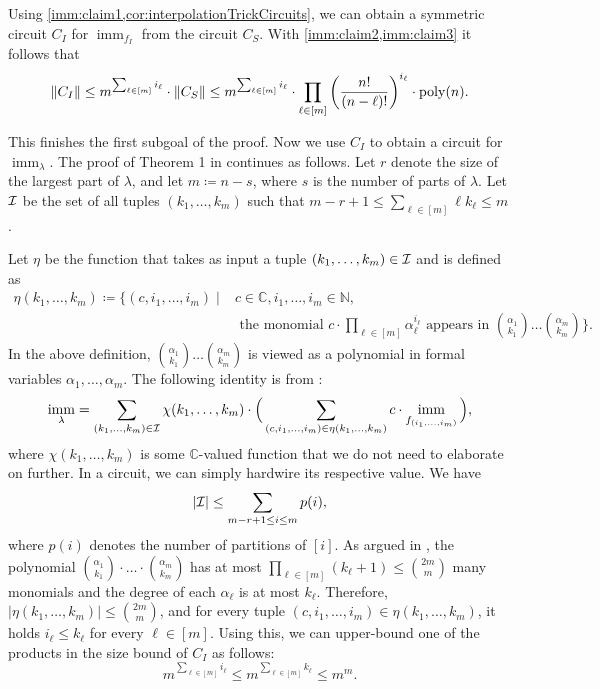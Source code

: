 \documentclass[11pt, DIV=15]{scrarticle}
\theoremstyle{definition}
\theoremstyle{plain}
\theoremstyle{remark}
\DeclarePairedDelimiter{\norm}{\lVert}{\rVert}
\newcommand{\Ii}{{\cal I}}
\newcommand{\bbN}{\mathbb{N}}
\DeclareMathOperator{\imm}{imm}
\begin{document}
Using \cref{imm:claim1,cor:interpolationTrickCircuits}, we can obtain a symmetric circuit $C_I$ for $\imm_{f_I}$ from the circuit $C_S$. With \cref{imm:claim2,imm:claim3} it follows that 
\[
\norm{C_I} \leq m^{\sum_{\ell \in [m]} i_\ell} \cdot \norm{C_S} \leq  m^{\sum_{\ell \in [m]} i_\ell} \cdot \prod_{\ell \in [m]} \left(\frac{n!}{(n-\ell)!} \right)^{i_\ell} \cdot \operatorname{poly}(n).
\]

This finishes the first subgoal of the proof. Now we use $C_I$ to obtain a circuit for $\imm_{\lambda}$.
The proof of Theorem 1 in \cite{hartmann1985complexity} continues as follows. Let $r$ denote the size of the largest part of $\lambda$, and let $m \coloneqq n-s$, where $s$ is the number of parts of $\lambda$.
Let $\Ii$ be the set of all tuples $(k_1,\dots ,k_m)$ such that $m-r+1 \leq \sum_{\ell \in [m]} \ell k_\ell \leq m$.

 
Let $\eta$ be the function that takes as input a tuple $(k_1,\dots ,k_m) \in \Ii$ and is defined as
\begin{align*}
\eta(k_1,\dots ,k_m) \coloneqq \Big\{ (c,i_1,\dots ,i_m) \mid &c \in \mathbb{C}, i_1,\dots ,i_m \in \bbN,\\
 &\text{ the monomial } c\cdot \prod_{\ell \in [m]} \alpha_\ell^{i_\ell}  \text{ appears in }  \binom{\alpha_1}{k_1} \dots   \binom{\alpha_m}{k_m} \Big\}.
\end{align*}
In the above definition,  $\binom{\alpha_1}{k_1} \dots  \binom{\alpha_m}{k_m}$ is viewed as a polynomial in formal variables $\alpha_1,\dots ,\alpha_m$.
The following identity is from \cite{hartmann1985complexity}:
\begin{align}
\imm_{\lambda} = \sum_{(k_1,\dots ,k_m) \in \Ii} \chi(k_1,\dots ,k_m) \cdot \Big( \sum_{(c,i_1,\dots ,i_m) \in \eta(k_1,\dots ,k_m)}  c \cdot \imm_{f_{(i_1,\dots ,i_m)}} \Big),\label{eq:star1}
\end{align}
where $\chi(k_1,\dots ,k_m)$ is some $\mathbb{C}$-valued function that we do not need to elaborate on further. In a circuit, we can simply hardwire its respective value.
We have 
\[
| \Ii | \leq \sum_{m-r+1\leq i \leq m} p(i),
\]
where $p(i)$ denotes the number of partitions of $[i]$.
As argued in \cite{hartmann1985complexity}, the polynomial $\binom{\alpha_1}{k_1}\cdot \dots  \cdot \binom{\alpha_m}{k_m}$ has at most $\prod_{\ell \in [m]} (k_\ell+1) \leq \binom{2m}{m}$ many monomials and the degree of each $\alpha_\ell$ is at most $k_\ell$.
Therefore, $|\eta(k_1,\dots ,k_m)| \leq \binom{2m}{m}$, and for every tuple $(c,i_1,\dots ,i_m) \in \eta(k_1,\dots ,k_m)$, it holds $i_\ell \leq k_\ell$ for every $\ell \in [m]$. Using this, we can upper-bound one of the products in the size bound of $C_I$ as follows:
\[
m^{\sum_{\ell \in [m]} i_\ell} \leq m^{\sum_{\ell \in [m]} k_\ell} \leq m^m.
\]	
\end{document}
